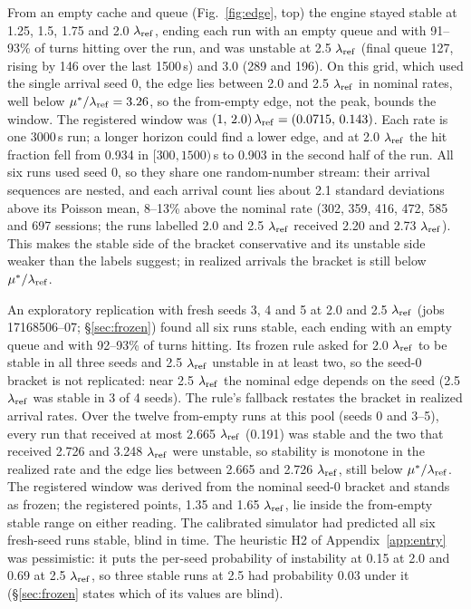 From an empty cache and queue (Fig.~\ref{fig:edge}, top) the engine stayed stable at 1.25, 1.5, 1.75 and 2.0 $\lambda_{\mathrm{ref}}$, ending each run with an empty queue and with 91--93\% of turns hitting over the run, and was unstable at 2.5 $\lambda_{\mathrm{ref}}$ (final queue 127, rising by 146 over the last 1500\,s) and 3.0 (289 and 196). On this grid, which used the single arrival seed 0, the edge lies between 2.0 and 2.5 $\lambda_{\mathrm{ref}}$ in nominal rates, well below $\mu^*/\lambda_{\mathrm{ref}}=3.26$, so the from-empty edge, not the peak, bounds the window. The registered window was $(1,\,2.0)\,\lambda_{\mathrm{ref}}=(0.0715,\,0.143)$\sps. Each rate is one 3000\,s run; a longer horizon could find a lower edge, and at 2.0 $\lambda_{\mathrm{ref}}$ the hit fraction fell from 0.934 in $[300,1500)$\,s to 0.903 in the second half of the run. All six runs used seed 0, so they share one random-number stream: their arrival sequences are nested, and each arrival count lies about 2.1 standard deviations above its Poisson mean, 8--13\% above the nominal rate (302, 359, 416, 472, 585 and 697 sessions; the runs labelled 2.0 and 2.5 $\lambda_{\mathrm{ref}}$ received 2.20 and 2.73 $\lambda_{\mathrm{ref}}$). This makes the stable side of the bracket conservative and its unstable side weaker than the labels suggest; in realized arrivals the bracket is still below $\mu^*/\lambda_{\mathrm{ref}}$.

An exploratory replication with fresh seeds 3, 4 and 5 at 2.0 and 2.5 $\lambda_{\mathrm{ref}}$ (jobs 17168506--07; \S\ref{sec:frozen}) found all six runs stable, each ending with an empty queue and with 92--93\% of turns hitting. Its frozen rule asked for 2.0 $\lambda_{\mathrm{ref}}$ to be stable in all three seeds and 2.5 $\lambda_{\mathrm{ref}}$ unstable in at least two, so the seed-0 bracket is not replicated: near 2.5 $\lambda_{\mathrm{ref}}$ the nominal edge depends on the seed (2.5 $\lambda_{\mathrm{ref}}$ was stable in 3 of 4 seeds). The rule's fallback restates the bracket in realized arrival rates. Over the twelve from-empty runs at this pool (seeds 0 and 3--5), every run that received at most 2.665 $\lambda_{\mathrm{ref}}$ (0.191\sps) was stable and the two that received 2.726 and 3.248 $\lambda_{\mathrm{ref}}$ were unstable, so stability is monotone in the realized rate and the edge lies between 2.665 and 2.726 $\lambda_{\mathrm{ref}}$, still below $\mu^*/\lambda_{\mathrm{ref}}$. The registered window was derived from the nominal seed-0 bracket and stands as frozen; the registered points, 1.35 and 1.65 $\lambda_{\mathrm{ref}}$, lie inside the from-empty stable range on either reading. The calibrated simulator had predicted all six fresh-seed runs stable, blind in time. The heuristic H2 of Appendix~\ref{app:entry} was pessimistic: it puts the per-seed probability of instability at 0.15 at 2.0 and 0.69 at 2.5 $\lambda_{\mathrm{ref}}$, so three stable runs at 2.5 had probability 0.03 under it (\S\ref{sec:frozen} states which of its values are blind).

